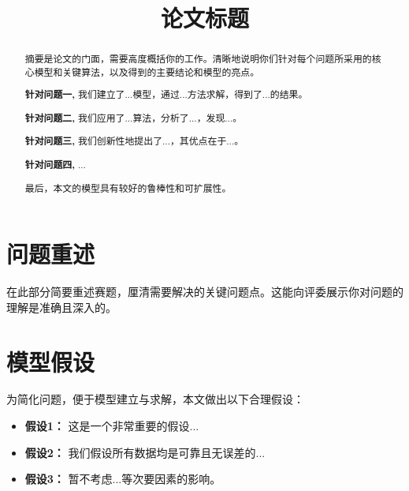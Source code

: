 \documentclass[withoutpreface,notoc]{cumcmthesis}
\title{论文标题} %
\begin{document}
	\maketitle
	\begin{abstract}
		摘要是论文的门面，需要高度概括你的工作。清晰地说明你们针对每个问题所采用的核心模型和关键算法，以及得到的主要结论和模型的亮点。
		
		\textbf{针对问题一,} 我们建立了...模型，通过...方法求解，得到了...的结果。
		
		\textbf{针对问题二,} 我们应用了...算法，分析了...，发现...。
		
		\textbf{针对问题三,} 我们创新性地提出了...，其优点在于...。
		
		\textbf{针对问题四,} ...
		
		最后，本文的模型具有较好的鲁棒性和可扩展性。
		
	\end{abstract}
	
	
	\section{问题重述}
	在此部分简要重述赛题，厘清需要解决的关键问题点。这能向评委展示你对问题的理解是准确且深入的。
	
	\section{模型假设}
	为简化问题，便于模型建立与求解，本文做出以下合理假设：
	\begin{itemize}[itemindent=2em]
		\item \textbf{假设1：} 这是一个非常重要的假设...
		\item \textbf{假设2：} 我们假设所有数据均是可靠且无误差的...
		\item \textbf{假设3：} 暂不考虑...等次要因素的影响。
	\end{itemize}
	
\end{document}
